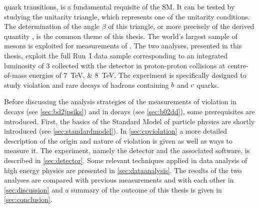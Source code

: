 quark transitions, is a fundamental requisite of the SM. It can be tested by
studying the unitarity triangle, which represents one of the unitarity
conditions. The determination of the angle $\beta$ of this triangle, or more
precisely of the derived quantity \sintwobeta, is the common theme of this
thesis. The world's largest sample of \Bz mesons is exploited for measurements
of \sintwobeta. The two analyses, presented in this thesis, exploit the full
Run~I data sample corresponding to an integrated luminosity of \SI{3}{\invfb}
collected with the \lhcb detector in proton-proton collisions at
centre-of-mass energies of \SIlist{7;8}{\TeV}. The \lhcb experiment is
specifically designed to study \CP violation and rare decays of hadrons
containing ${b}$ and ${c}$ quarks.

Before discussing the analysis strategies of the measurements of \CP violation
in \BdToJPsiKS decays (see \cref{sec:bd2jpsiks}) and in \BdToDD decays (see
\cref{sec:b02dd}), some prerequisites are introduced. First, the basics of the
Standard Model of particle physics are shortly introduced (see
\cref{sec:standardmodel}). In \cref{sec:cpviolation} a more detailed
description of the origin and nature of \CP violation is given as well as ways
to measure it. The \lhcb experiment, namely the detector and the associated
software, is described in \cref{sec:detector}. Some relevant techniques
applied in data analysis of high energy physics are presented in
\cref{sec:dataanalysis}. The results of the two analyses are compared with
previous measurements and with each other in \cref{sec:discussion} and a
summary of the outcome of this thesis is given in \cref{sec:conclusion}.
